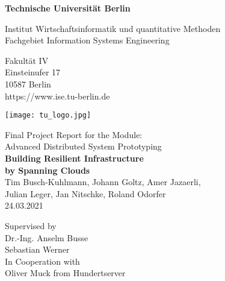 \thispagestyle{empty}
\begin{center}

\vspace*{0.4cm}
{\LARGE \textbf{Technische Universität Berlin}}

\vspace{0.5cm}

{\large Institut Wirtschaftsinformatik und quantitative Methoden\\[1mm]}
{\large Fachgebiet Information Systems Engineering\\[5mm]}

Fakultät IV\\
Einsteinufer 17\\
10587 Berlin\\
https://www.ise.tu-berlin.de\\

\vspace*{1cm}

\texttt{[image: tu\_logo.jpg]}

\vspace*{1.0cm}

{\LARGE Final Project Report for the Module:}\\
\vspace*{0.1cm}
{\LARGE Advanced Distributed System Prototyping}\\

\vspace{1.0cm}
{\LARGE \textbf{Building Resilient Infrastructure}}\\
\vspace*{0.3cm}
{\LARGE \textbf{by Spanning Clouds}}\\
\vspace*{1.0cm}
{\Large Tim Busch-Kuhlmann, Johann Goltz, Amer Jazaerli, \\ Julian Leger, Jan Nitschke, Roland Odorfer}
\\
\vspace*{0.2cm}
24.03.2021\\ %
\vspace*{0.5cm}

Supervised by\\
Dr.-Ing. Anselm Busse\\
Sebastian Werner\\
\vspace*{0.5cm}
In Cooperation with \\
Oliver Muck from Hundertserver
\vspace{3cm}


\end{center}

